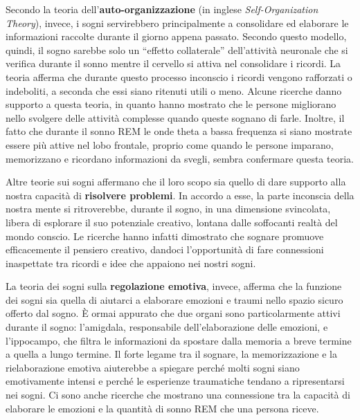 Secondo la teoria dell'\textbf{auto-organizzazione} (in inglese \textit{Self-Organization Theory}), invece, i sogni
servirebbero principalmente a consolidare ed elaborare le informazioni raccolte durante il giorno appena passato.
Secondo questo modello, quindi, il sogno sarebbe solo un ``effetto collaterale'' dell'attività neuronale
che si verifica durante il sonno mentre il cervello si attiva nel consolidare i ricordi.
La teoria afferma che durante questo processo inconscio i ricordi vengono rafforzati o indeboliti, a seconda
che essi siano ritenuti utili o meno.
Alcune ricerche danno supporto a questa teoria, in quanto hanno mostrato che le persone migliorano nello svolgere
delle attività complesse quando queste sognano di farle.
Inoltre, il fatto che durante il sonno REM le onde theta a bassa frequenza si siano mostrate essere più attive nel
lobo frontale, proprio come quando le persone imparano, memorizzano e ricordano informazioni da svegli,
sembra confermare questa teoria.


Altre teorie sui sogni affermano che il loro scopo sia quello di dare supporto alla nostra capacità di \textbf{risolvere
problemi}.
In accordo a esse, la parte inconscia della nostra mente si ritroverebbe, durante il sogno, in una dimensione
svincolata, libera di esplorare il suo potenziale creativo, lontana dalle soffocanti realtà del mondo conscio.
Le ricerche hanno infatti dimostrato che sognare promuove efficacemente il pensiero creativo, dandoci l'opportunità
di fare connessioni inaspettate tra ricordi e idee che appaiono nei nostri sogni.


La teoria dei sogni sulla \textbf{regolazione emotiva}, invece, afferma che la funzione dei sogni sia quella di aiutarci
a elaborare emozioni e traumi nello spazio sicuro offerto dal sogno.
\`E ormai appurato che due organi sono particolarmente attivi durante il sogno: l'amigdala,
responsabile dell'elaborazione delle emozioni, e l'ippocampo, che filtra
le informazioni da spostare dalla memoria a breve termine a quella a lungo termine.
Il forte legame tra il sognare, la memorizzazione e la rielaborazione emotiva aiuterebbe a spiegare perché molti sogni
siano emotivamente intensi e perché le esperienze traumatiche tendano a ripresentarsi nei sogni.
Ci sono anche ricerche che mostrano una connessione tra la capacità di elaborare le emozioni e la quantità di sonno
REM che una persona riceve. \newline

